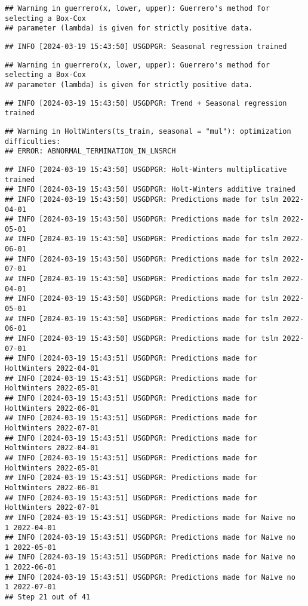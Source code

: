 \documentclass[
]{article}
\begin{document}
\begin{verbatim}
## Warning in guerrero(x, lower, upper): Guerrero's method for selecting a Box-Cox
## parameter (lambda) is given for strictly positive data.
\end{verbatim}

\begin{verbatim}
## INFO [2024-03-19 15:43:50] USGDPGR: Seasonal regression trained
\end{verbatim}

\begin{verbatim}
## Warning in guerrero(x, lower, upper): Guerrero's method for selecting a Box-Cox
## parameter (lambda) is given for strictly positive data.
\end{verbatim}

\begin{verbatim}
## INFO [2024-03-19 15:43:50] USGDPGR: Trend + Seasonal regression trained
\end{verbatim}

\begin{verbatim}
## Warning in HoltWinters(ts_train, seasonal = "mul"): optimization difficulties:
## ERROR: ABNORMAL_TERMINATION_IN_LNSRCH
\end{verbatim}

\begin{verbatim}
## INFO [2024-03-19 15:43:50] USGDPGR: Holt-Winters multiplicative trained
## INFO [2024-03-19 15:43:50] USGDPGR: Holt-Winters additive trained
## INFO [2024-03-19 15:43:50] USGDPGR: Predictions made for tslm 2022-04-01
## INFO [2024-03-19 15:43:50] USGDPGR: Predictions made for tslm 2022-05-01
## INFO [2024-03-19 15:43:50] USGDPGR: Predictions made for tslm 2022-06-01
## INFO [2024-03-19 15:43:50] USGDPGR: Predictions made for tslm 2022-07-01
## INFO [2024-03-19 15:43:50] USGDPGR: Predictions made for tslm 2022-04-01
## INFO [2024-03-19 15:43:50] USGDPGR: Predictions made for tslm 2022-05-01
## INFO [2024-03-19 15:43:50] USGDPGR: Predictions made for tslm 2022-06-01
## INFO [2024-03-19 15:43:50] USGDPGR: Predictions made for tslm 2022-07-01
## INFO [2024-03-19 15:43:51] USGDPGR: Predictions made for HoltWinters 2022-04-01
## INFO [2024-03-19 15:43:51] USGDPGR: Predictions made for HoltWinters 2022-05-01
## INFO [2024-03-19 15:43:51] USGDPGR: Predictions made for HoltWinters 2022-06-01
## INFO [2024-03-19 15:43:51] USGDPGR: Predictions made for HoltWinters 2022-07-01
## INFO [2024-03-19 15:43:51] USGDPGR: Predictions made for HoltWinters 2022-04-01
## INFO [2024-03-19 15:43:51] USGDPGR: Predictions made for HoltWinters 2022-05-01
## INFO [2024-03-19 15:43:51] USGDPGR: Predictions made for HoltWinters 2022-06-01
## INFO [2024-03-19 15:43:51] USGDPGR: Predictions made for HoltWinters 2022-07-01
## INFO [2024-03-19 15:43:51] USGDPGR: Predictions made for Naive no  1 2022-04-01
## INFO [2024-03-19 15:43:51] USGDPGR: Predictions made for Naive no  1 2022-05-01
## INFO [2024-03-19 15:43:51] USGDPGR: Predictions made for Naive no  1 2022-06-01
## INFO [2024-03-19 15:43:51] USGDPGR: Predictions made for Naive no  1 2022-07-01
## Step 21 out of 41
\end{verbatim}
\end{document}
